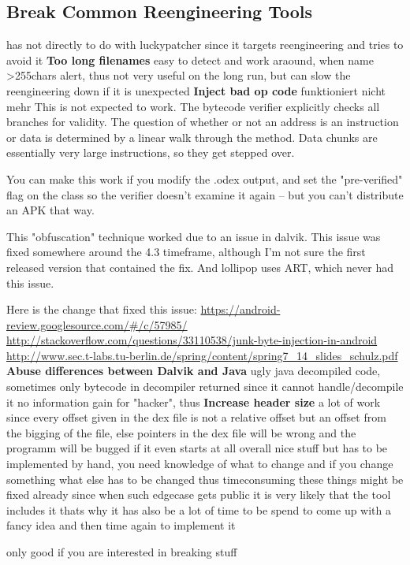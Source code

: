 \subsection{Break Common Reengineering Tools}
\label{subsection:evaluation-reengineering-break}
has not directly to do with luckypatcher since it targets reengineering and tries to avoid it
\newline
\newline
\textbf{Too long filenames} \newline
easy to detect and work araound, when name >255chars alert, thus not very useful on the long run, but can slow the reengineering down if it is unexpected
\newline
\newline
\textbf{Inject bad op code} \newline
funktioniert nicht mehr
This is not expected to work. The bytecode verifier explicitly checks all branches for validity. The question of whether or not an address is an instruction or data is determined by a linear walk through the method. Data chunks are essentially very large instructions, so they get stepped over.

You can make this work if you modify the .odex output, and set the "pre-verified" flag on the class so the verifier doesn't examine it again -- but you can't distribute an APK that way.

This "obfuscation" technique worked due to an issue in dalvik. This issue was fixed somewhere around the 4.3 timeframe, although I'm not sure the first released version that contained the fix. And lollipop uses ART, which never had this issue.

Here is the change that fixed this issue: \url{https://android-review.googlesource.com/#/c/57985/}
\url{http://stackoverflow.com/questions/33110538/junk-byte-injection-in-android}
\url{http://www.sec.t-labs.tu-berlin.de/spring/content/spring7_14_slides_schulz.pdf
}
%
\newline
\newline
\textbf{Abuse differences between Dalvik and Java} \newline
ugly java decompiled code, sometimes only bytecode in decompiler returned since it cannot handle/decompile it
no information gain for "hacker", thus
\newline
\newline
\textbf{Increase header size} \newline
a lot of work since every offset given in the dex file is not a relative offset but an offset from the bigging of the file, else pointers in the dex file will be wrong and the programm will be bugged if it even starts at all
overall nice stuff but has to be implemented by hand, you need knowledge of what to change and if you change something what else has to be changed thus timeconsuming
these things might be fixed already since when such edgecase gets public it is very likely that the tool includes it thats why it has also be a lot of time to be spend to come up with a fancy idea and then time again to implement it

only good if you are interested in breaking stuff
